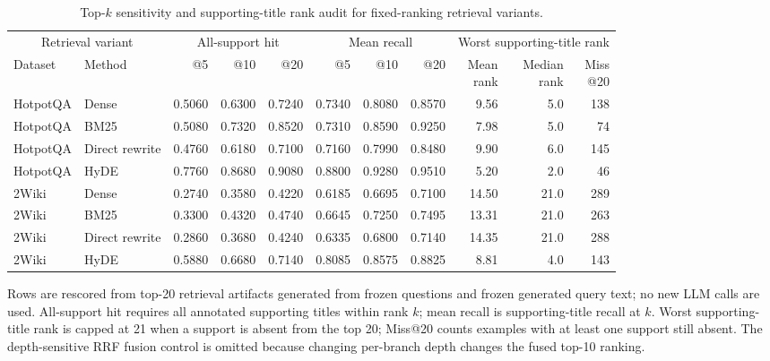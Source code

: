 \begin{table}[t]
\centering
\caption{Top-$k$ sensitivity and supporting-title rank audit for fixed-ranking retrieval variants.}
\label{tab:topk_sensitivity}
\footnotesize
\begin{threeparttable}
\setlength{\tabcolsep}{2.0pt}
\renewcommand{\arraystretch}{1.12}
\begin{tabularx}{\textwidth}{@{}l l r r r r r r r r r@{}}
\toprule
\multicolumn{2}{c}{Retrieval variant} & \multicolumn{3}{c}{All-support hit} & \multicolumn{3}{c}{Mean recall} & \multicolumn{3}{c}{Worst supporting-title rank} \\
\cmidrule(lr){1-2}\cmidrule(lr){3-5}\cmidrule(lr){6-8}\cmidrule(lr){9-11}
Dataset & Method & @5 & @10 & @20 & @5 & @10 & @20 & \shortstack{Mean\\rank} & \shortstack{Median\\rank} & \shortstack{Miss\\@20} \\
\midrule
HotpotQA & Dense & 0.5060 & 0.6300 & 0.7240 & 0.7340 & 0.8080 & 0.8570 & 9.56 & 5.0 & 138 \\
HotpotQA & BM25 & 0.5080 & 0.7320 & 0.8520 & 0.7310 & 0.8590 & 0.9250 & 7.98 & 5.0 & 74 \\
HotpotQA & Direct rewrite & 0.4760 & 0.6180 & 0.7100 & 0.7160 & 0.7990 & 0.8480 & 9.90 & 6.0 & 145 \\
\rowcolor{gray!6} HotpotQA & HyDE & 0.7760 & 0.8680 & 0.9080 & 0.8800 & 0.9280 & 0.9510 & 5.20 & 2.0 & 46 \\
\addlinespace[2pt]
2Wiki & Dense & 0.2740 & 0.3580 & 0.4220 & 0.6185 & 0.6695 & 0.7100 & 14.50 & 21.0 & 289 \\
2Wiki & BM25 & 0.3300 & 0.4320 & 0.4740 & 0.6645 & 0.7250 & 0.7495 & 13.31 & 21.0 & 263 \\
2Wiki & Direct rewrite & 0.2860 & 0.3680 & 0.4240 & 0.6335 & 0.6800 & 0.7140 & 14.35 & 21.0 & 288 \\
\rowcolor{gray!6} 2Wiki & HyDE & 0.5880 & 0.6680 & 0.7140 & 0.8085 & 0.8575 & 0.8825 & 8.81 & 4.0 & 143 \\
\bottomrule
\end{tabularx}
\begin{tablenotes}
\footnotesize
\item Rows are rescored from top-20 retrieval artifacts generated from frozen questions and frozen generated query text; no new LLM calls are used. All-support hit requires all annotated supporting titles within rank $k$; mean recall is supporting-title recall at $k$. Worst supporting-title rank is capped at 21 when a support is absent from the top 20; Miss@20 counts examples with at least one support still absent. The depth-sensitive RRF fusion control is omitted because changing per-branch depth changes the fused top-10 ranking.
\end{tablenotes}
\end{threeparttable}
\end{table}
